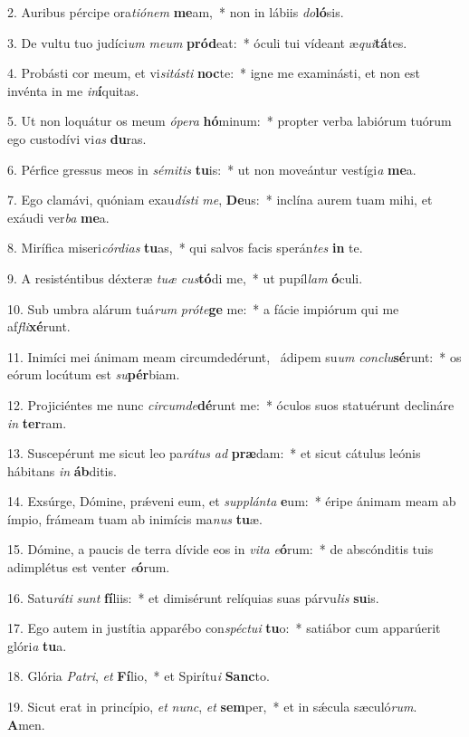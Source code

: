 2. Auribus pércipe ora\textit{ti}\textit{ó}\textit{nem} \textbf{me}am,~*  non in lábiis \textit{do}\textbf{ló}sis.\

3. De vultu tuo judíci\textit{um} \textit{me}\textit{um} \textbf{pród}eat:~*  óculi tui vídeant æ\textit{qui}\textbf{tá}tes.\

4. Probásti cor meum, et vi\textit{si}\textit{tás}\textit{ti} \textbf{noc}te:~*  igne me examinásti, et non est invénta in me \textit{in}\textbf{í}quitas.\

5. Ut non loquátur os meum \textit{ó}\textit{pe}\textit{ra} \textbf{hó}minum:~*  propter verba labiórum tuórum ego custodívi vi\textit{as} \textbf{du}ras.\

6. Pérfice gressus meos in \textit{sé}\textit{mi}\textit{tis} \textbf{tu}is:~*  ut non moveántur vestígi\textit{a} \textbf{me}a.\

7. Ego clamávi, quóniam exau\textit{dís}\textit{ti} \textit{me}, \textbf{De}us:~*  inclína aurem tuam mihi, et exáudi ver\textit{ba} \textbf{me}a.\

8. Mirífica miseri\textit{cór}\textit{di}\textit{as} \textbf{tu}as,~*  qui salvos facis sperán\textit{tes} \textbf{in} te.\

9. A resisténtibus déxteræ \textit{tu}\textit{æ} \textit{cus}\textbf{tó}di me,~*  ut pupíl\textit{lam} \textbf{ó}culi.\

10. Sub umbra alárum tuá\textit{rum} \textit{pró}\textit{te}\textbf{ge} me:~*  a fácie impiórum qui me af\textit{fli}\textbf{xé}runt.\

11. Inimíci mei ánimam meam circumdedérunt, \dag\  ádipem su\textit{um} \textit{con}\textit{clu}\textbf{sé}runt:~*  os eórum locútum est \textit{su}\textbf{pér}biam.\

12. Projiciéntes me nunc \textit{cir}\textit{cum}\textit{de}\textbf{dé}runt me:~*  óculos suos statuérunt declináre \textit{in} \textbf{ter}ram.\

13. Suscepérunt me sicut leo pa\textit{rá}\textit{tus} \textit{ad} \textbf{præ}dam:~*  et sicut cátulus leónis hábitans \textit{in} \textbf{áb}ditis.\

14. Exsúrge, Dómine, prǽveni eum, et \textit{sup}\textit{plán}\textit{ta} \textbf{e}um:~*  éripe ánimam meam ab ímpio, frámeam tuam ab inimícis ma\textit{nus} \textbf{tu}æ.\

15. Dómine, a paucis de terra dívide eos in \textit{vi}\textit{ta} \textit{e}\textbf{ó}rum:~*  de abscónditis tuis adimplétus est venter \textit{e}\textbf{ó}rum.\

16. Satu\textit{rá}\textit{ti} \textit{sunt} \textbf{fí}liis:~*  et dimisérunt relíquias suas párvu\textit{lis} \textbf{su}is.\

17. Ego autem in justítia apparébo con\textit{spéc}\textit{tu}\textit{i} \textbf{tu}o:~*  satiábor cum apparúerit glóri\textit{a} \textbf{tu}a.\

18. Glória \textit{Pa}\textit{tri}, \textit{et} \textbf{Fí}lio,~*  et Spirítu\textit{i} \textbf{Sanc}to.\

19. Sicut erat in princípio, \textit{et} \textit{nunc}, \textit{et} \textbf{sem}per,~*  et in sǽcula sæculó\textit{rum}. \textbf{A}men.\

